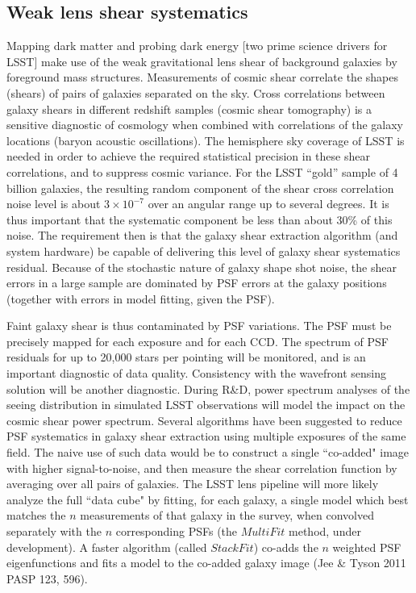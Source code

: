 \documentclass[SE,toc]{lsstdoc}
\begin{document}
\subsection{Weak lens shear systematics}

Mapping dark matter and probing dark energy [two prime science drivers for LSST] make use of the weak gravitational lens shear of background galaxies by foreground mass structures. Measurements of cosmic shear correlate the shapes (shears) of pairs of galaxies separated on the sky.  Cross correlations between galaxy shears in different redshift samples (cosmic shear tomography) is a sensitive diagnostic of cosmology when combined with correlations of the galaxy locations (baryon acoustic oscillations). The hemisphere sky coverage of LSST is needed in order to achieve the required statistical precision in these shear correlations, and to suppress cosmic variance.  For the LSST ``gold'' sample of 4 billion galaxies, the resulting random component of the shear cross correlation noise level is about $3\times10^{-7}$ over an angular range up to several degrees.  It is thus important that the systematic component be less than about 30\% of this noise.  The requirement then is that the galaxy shear extraction algorithm (and system hardware) be capable of delivering this level of galaxy shear systematics residual.  Because of the stochastic nature of galaxy shape shot noise, the shear errors in a large sample are dominated by PSF errors at the galaxy positions (together with errors in model fitting, given the PSF).

Faint galaxy shear is thus contaminated by PSF variations. The PSF must be precisely mapped for each exposure and for each CCD. The spectrum of PSF residuals for up to 20,000 stars per pointing will be monitored, and is an important diagnostic of data quality. Consistency with the wavefront sensing solution will be another diagnostic.  During R\&D, power spectrum analyses of the seeing distribution in simulated LSST observations will model the impact on the cosmic shear power spectrum.  Several algorithms have been suggested to reduce PSF systematics in galaxy shear extraction using multiple exposures of the same field.  The naive use of such data would be to construct a single ``co-added" image with higher signal-to-noise, and then measure the shear correlation function by averaging over all pairs of galaxies.  The LSST lens pipeline will more likely analyze the full ``data cube" by fitting, for each galaxy, a single model which best matches the $n$ measurements of that galaxy in the survey, when convolved separately with the $n$ corresponding PSFs (the $MultiFit$ method, under development). A faster algorithm (called $StackFit$) co-adds the $n$ weighted PSF eigenfunctions and fits a model to the co-added galaxy image (Jee \& Tyson 2011 PASP 123, 596).
\end{document}
